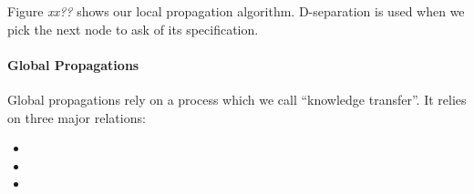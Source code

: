 

Figure \emph{xx??} shows our local propagation algorithm. D-separation is used
when we pick the next node to ask of its specification. 


\paragraph{Global Propagations}

Global propagations rely on a process which we call ``knowledge transfer''. It
relies on three major relations:

\begin{itemize}
\item
\item
\item
\end{itemize}

